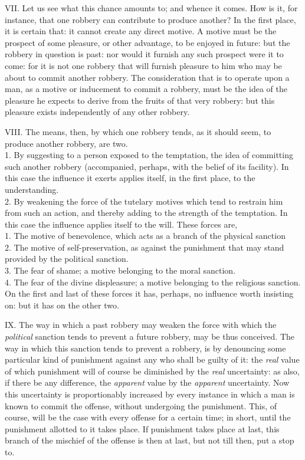 \documentclass[12pt]{report}
\begin{document}
VII. Let us see what this chance amounts to; and whence it comes. How is
it, for instance, that one robbery can contribute to produce another? In
the first place, it is certain that: it cannot create any direct motive.
A motive must be the prospect of some pleasure, or other advantage, to
be enjoyed in future: but the robbery in question is past: nor would it
furnish any such prospect were it to come: for it is not one robbery
that will furnish pleasure to him who may be about to commit another
robbery. The consideration that is to operate upon a man, as a motive or
inducement to commit a robbery, must be the idea of the pleasure he
expects to derive from the fruits of that very robbery: but this
pleasure exists independently of any other robbery.

VIII. The means, then, by which one robbery tends, as it should seem, to
produce another robbery, are two.\\
1. By suggesting to a person exposed to the temptation, the idea of
committing such another robbery (accompanied, perhaps, with the belief
of its facility). In this case the influence it exerts applies itself,
in the first place, to the understanding.\\
2. By weakening the force of the tutelary motives which tend to restrain
him from such an action, and thereby adding to the strength of the
temptation. In this case the influence applies itself to the will. These
forces are,\\
1. The motive of benevolence, which acts as a branch of the physical
sanction\\
2. The motive of self-preservation, as against the punishment that may
stand provided by the political sanction.\\
3. The fear of shame; a motive belonging to the moral sanction.\\
4. The fear of the divine displeasure; a motive belonging to the
religious sanction. On the first and last of these forces it has,
perhaps, no influence worth insisting on: but it has on the other two.

IX. The way in which a past robbery may weaken the force with which the
\emph{political} sanction tends to prevent a future robbery, may be thus
conceived. The way in which this sanction tends to prevent a robbery, is
by denouncing some particular kind of punishment against any who shall
be guilty of it: the \emph{real} value of which punishment will of
course be diminished by the \emph{real} uncertainty: as also, if there
be any difference, the \emph{apparent} value by the \emph{apparent}
uncertainty. Now this uncertainty is proportionably increased by every
instance in which a man is known to commit the offense, without
undergoing the punishment. This, of course, will be the case with every
offense for a certain time; in short, until the punishment allotted to
it takes place. If punishment takes place at last, this branch of the
mischief of the offense is then at last, but not till then, put a stop
to.
\end{document}
